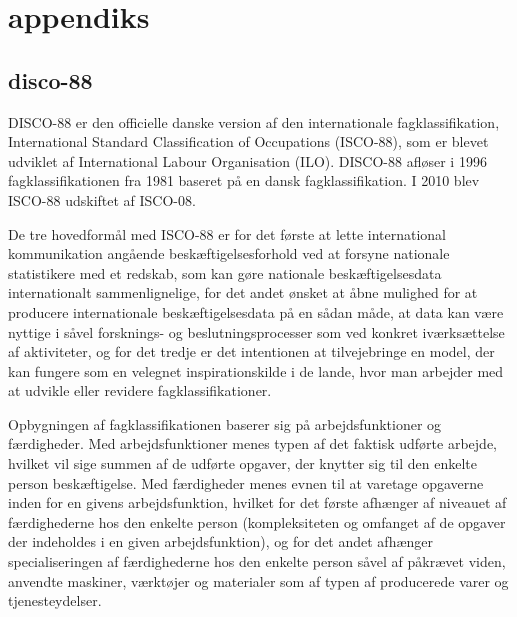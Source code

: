 
\chapter{appendiks} \label{appendiks}


\section{disco-88 \label{}}

DISCO-88 er den officielle danske version af den internationale fagklassifikation, International Standard Classification of Occupations (ISCO-88), som er blevet udviklet af International Labour Organisation (ILO). DISCO-88 afløser i 1996 fagklassifikationen fra 1981 baseret på en dansk fagklassifikation. I 2010 blev ISCO-88 udskiftet af ISCO-08.

De tre hovedformål med ISCO-88 er for det første at lette international kommunikation angående
beskæftigelsesforhold ved at forsyne nationale statistikere med et redskab, som kan
gøre nationale beskæftigelsesdata internationalt sammenlignelige, for det andet ønsket at åbne mulighed for at producere internationale beskæftigelsesdata på en sådan måde, at data kan være nyttige i såvel forsknings- og beslutningsprocesser som ved konkret iværksættelse af aktiviteter, og for det tredje er det intentionen at tilvejebringe en model, der kan fungere som en
velegnet inspirationskilde i de lande, hvor man arbejder med at udvikle eller revidere
fagklassifikationer.

Opbygningen af fagklassifikationen baserer sig på arbejdsfunktioner og færdigheder. Med arbejdsfunktioner menes typen af det faktisk udførte arbejde, hvilket vil sige summen af de udførte opgaver, der knytter sig til den enkelte person beskæftigelse. 
Med færdigheder menes evnen til at varetage opgaverne inden for en givens arbejdsfunktion, hvilket for det første afhænger af niveauet af færdighederne hos den enkelte person (kompleksiteten og omfanget af de opgaver der indeholdes i en given arbejdsfunktion), og for det andet afhænger specialiseringen af færdighederne hos den enkelte person såvel af påkrævet viden, anvendte maskiner, værktøjer og materialer som af typen af producerede varer og tjenesteydelser.

